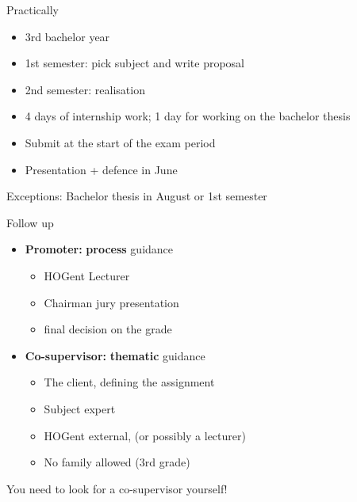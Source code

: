 \documentclass[aspectratio=169]{beamer}
\begin{document}
    \begin{frame}{Practically}
        
        \begin{itemize}
            \item 3rd bachelor year 
            \item 1st semester: pick subject and write proposal
            \item 2nd semester: realisation
            \item 4 days of internship work; 1 day for working on the bachelor thesis
            \item Submit at the start of the exam period
            \item Presentation + defence in June
        \end{itemize}
        
        \bigskip
        
        Exceptions: Bachelor thesis in August or 1st semester
    \end{frame}
    
    \begin{frame}{Follow up}
        
        \begin{itemize}
            \item \textbf{Promoter:} \textbf{process} guidance
            \begin{itemize}
                \item HOGent Lecturer
                \item Chairman jury presentation
                \item final decision on the grade
            \end{itemize}
            \item \textbf{Co-supervisor:} \textbf{thematic} guidance
            \begin{itemize}
                \item The client, defining the assignment 
                \item Subject expert
                \item HOGent external, (or possibly a lecturer)
                \item No family allowed (3rd grade)
            \end{itemize}
        \end{itemize}
        
        \bigskip
        
        You need to look for a co-supervisor yourself!
        
    \end{frame}
    
\end{document}
